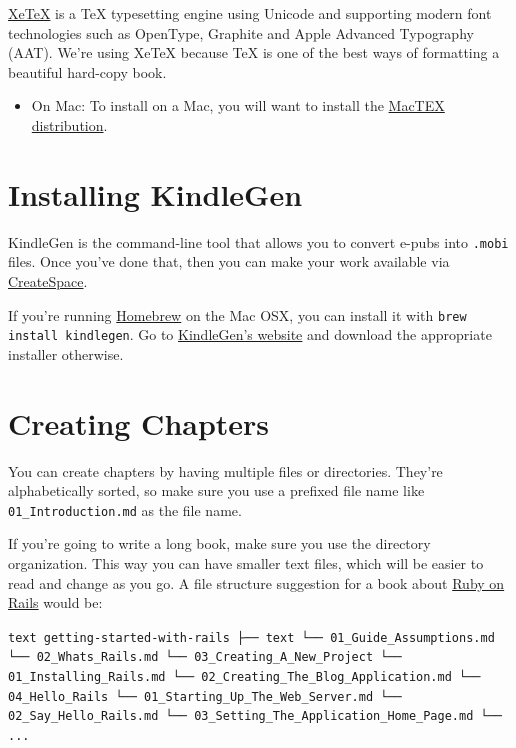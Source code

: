 \documentclass[11pt,twoside,makeidx,hidelinks,]{memoir}
\begin{document}
\href{hhttps://en.wikipedia.org/wiki/XeTeX}{XeTeX} is a TeX typesetting engine using Unicode and supporting modern font technologies such as OpenType, Graphite and Apple Advanced Typography (AAT). We're using XeTeX because TeX is one of the best ways of formatting a beautiful hard-copy book.

\begin{itemize}
\item{} On Mac: To install on a Mac, you will want to install the \href{https://tug.org/mactex/}{MacTEX distribution}.
\end{itemize}

\section{Installing KindleGen}\hypertarget{installing-kindlegen}{}\label{installing-kindlegen}

KindleGen is the command-line tool that allows you to convert e-pubs into \texttt{.mobi} files. Once you've done that, then you can make your work available via \href{https://www.createspace.com/pub/member.dashboard.do}{CreateSpace}.

If you're running \href{http://brew.sh}{Homebrew} on the Mac OSX, you can install it with \texttt{brew install kindlegen}. Go to \href{http://www.amazon.com/gp/feature.html?docId=1000765211}{KindleGen's website} and download the appropriate installer otherwise.



\section{Creating Chapters}\hypertarget{creating-chapters}{}\label{creating-chapters}

You can create chapters by having multiple files or directories. They're alphabetically sorted, so make sure you use a prefixed file name like  \texttt{01\_Introduction.md} as the file name.

If you're going to write a long book, make sure you use the directory organization. This way you can have smaller text files, which will be easier to read and change as you go. A file structure suggestion for a book about \href{http://guides.rubyonrails.com}{Ruby on Rails} would be:

\texttt{text
getting-started-with-rails
├── text
    └── 01\_Guide\_Assumptions.md
    └── 02\_Whats\_Rails.md
    └── 03\_Creating\_A\_New\_Project
        └── 01\_Installing\_Rails.md
        └── 02\_Creating\_The\_Blog\_Application.md
    └── 04\_Hello\_Rails
        └── 01\_Starting\_Up\_The\_Web\_Server.md
        └── 02\_Say\_Hello\_Rails.md
        └── 03\_Setting\_The\_Application\_Home\_Page.md
    └── ...
}
\end{document}
